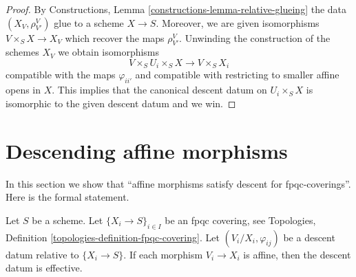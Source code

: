 \begin{proof}
\medskip\noindent
By Constructions, Lemma \ref{constructions-lemma-relative-glueing} the data
$(X_V, \rho^V_{V'})$ glue to a scheme $X \to S$.
Moreover, we are given isomorphisms $V \times_S X \to X_V$
which recover the maps $\rho^V_{V'}$. Unwinding the construction
of the schemes $X_V$ we obtain isomorphisms
$$
V \times_S U_i \times_S X
\longrightarrow
V \times_S X_i
$$
compatible with the maps $\varphi_{ii'}$ and compatible with
restricting to smaller affine opens in $X$. This implies that
the canonical descent datum on $U_i \times_S X$ is isomorphic
to the given descent datum and we win.
\end{proof}










\section{Descending affine morphisms}
\label{section-affine}

\noindent
In this section we show that
``affine morphisms satisfy descent for fpqc-coverings''.
Here is the formal statement.

\begin{lemma}
\label{lemma-affine}
Let $S$ be a scheme.
Let $\{X_i \to S\}_{i\in I}$ be an fpqc covering, see
Topologies, Definition \ref{topologies-definition-fpqc-covering}.
Let $(V_i/X_i, \varphi_{ij})$ be a descent datum
relative to $\{X_i \to S\}$. If each morphism
$V_i \to X_i$ is affine, then the descent datum is
effective.
\end{lemma}


